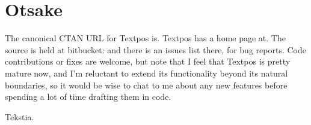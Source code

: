 \documentclass[twoside,a4paper]{article}
\begin{document}
\section{Otsake}
The canonical CTAN URL for Textpos is.
Textpos has a home page at. The
source is held at bitbucket: and there
is an issues list there, for bug reports. Code contributions or fixes are welcome,
but note that I feel that Textpos is pretty mature now, and I’m reluctant to extend
its functionality beyond its natural boundaries, so it would be wise to chat to me
about any new features before spending a lot of time drafting them in code.




\newpage

\renewcommand{\olmnumberofpapers}{3}
Tekstia.
\newpage
\layout

\newpage
\layout
\end{document}
